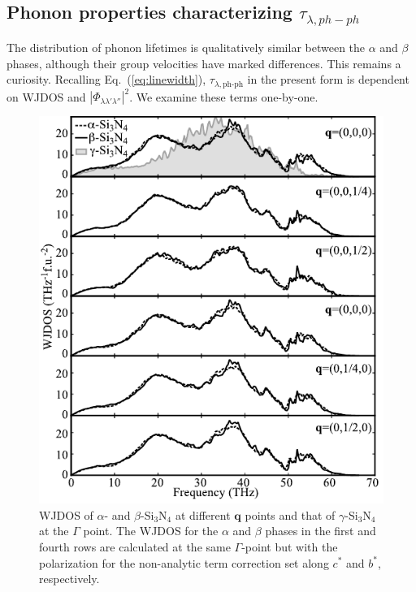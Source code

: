 \documentclass[twocolumn,amsmath,amssymb,a4paper,prb,superscriptaddress,floatfix]{revtex4-1}
\begin{document}
\subsection{Phonon properties characterizing $\tau_{\lambda,ph-ph}$}

The distribution of phonon lifetimes is qualitatively similar between the $\alpha$ and
$\beta$ phases, although their group velocities have marked differences. This
remains a curiosity.
Recalling Eq.~(\ref{eq:linewidth}), $\tau_{\lambda,\text{ph-ph}}$ in the
present form is dependent on WJDOS
and $|\Phi_{\lambda\lambda'\lambda''}|^2$. We examine these terms one-by-one.

\begin{figure}[ht]
 \centering
  \includegraphics[width=0.9\linewidth]{figure_wjdoss_gray.pdf} \caption{
          WJDOS of $\alpha$- and $\beta$-Si$_3$N$_4$ at different $\mathbf
          q$ points and that of $\gamma$-Si$_3$N$_4$ at the $\Gamma$ point.
  The WJDOS for the $\alpha$ and $\beta$ phases in the  first and fourth rows
  are calculated at the same $\Gamma$-point but
  with the polarization for the non-analytic term correction set along $c^*$ and
  $b^*$, respectively. \label{fig:Fig6_338} }
 \centering
\end{figure}
\end{document}
